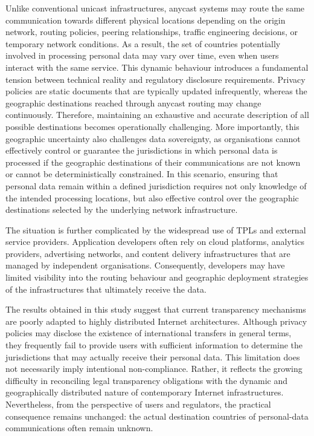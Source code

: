 Unlike conventional unicast infrastructures, anycast systems may route the same communication towards different physical locations depending on the origin network, routing policies, peering relationships, traffic engineering decisions, or temporary network conditions. As a result, the set of countries potentially involved in processing personal data may vary over time, even when users interact with the same service. This dynamic behaviour introduces a fundamental tension between technical reality and regulatory disclosure requirements. Privacy policies are static documents that are typically updated infrequently, whereas the geographic destinations reached through anycast routing may change continuously. Therefore, maintaining an exhaustive and accurate description of all possible destinations becomes operationally challenging. More importantly, this geographic uncertainty also challenges data sovereignty, as organisations cannot effectively control or guarantee the jurisdictions in which personal data is processed if the geographic destinations of their communications are not known or cannot be deterministically constrained. In this scenario, ensuring that personal data remain within a defined jurisdiction requires not only knowledge of the intended processing locations, but also effective control over the geographic destinations selected by the underlying network infrastructure.

The situation is further complicated by the widespread use of TPLs and external service providers. Application developers often rely on cloud platforms, analytics providers, advertising networks, and content delivery infrastructures that are managed by independent organisations. Consequently, developers may have limited visibility into the routing behaviour and geographic deployment strategies of the infrastructures that ultimately receive the data.

The results obtained in this study suggest that current transparency mechanisms are poorly adapted to highly distributed Internet architectures. Although privacy policies may disclose the existence of international transfers in general terms, they frequently fail to provide users with sufficient information to determine the jurisdictions that may actually receive their personal data. This limitation does not necessarily imply intentional non-compliance. Rather, it reflects the growing difficulty in reconciling legal transparency obligations with the dynamic and geographically distributed nature of contemporary Internet infrastructures. Nevertheless, from the perspective of users and regulators, the practical consequence remains unchanged: the actual destination countries of personal-data communications often remain unknown.

